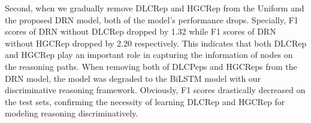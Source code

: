\documentclass[11pt,a4paper]{article}
\begin{document}
\begin{table}[h]
\begin{center}
\caption{Ablation experiments.}
\label{table:ablation}
\end{center}
\end{table}
Second, when we gradually remove DLCRep and HGCRep from the Uniform and the proposed DRN model, both of the model's performance drops.
Specially, F1 scores of DRN without DLCRep dropped by 1.32 while F1 scores of DRN without HGCRep dropped by 2.20 respectively. 
This indicates that both DLCRep and HGCRep play an important role in capturing the information of nodes on the reasoning paths. 
When removing both of DLCPeps and HGCReps from the DRN model, the model was degraded to the BiLSTM model with our discriminative reasoning framework. 
Obviously, F1 scores drastically decreased on the test sets, confirming the necessity of learning DLCRep and HGCRep for modeling reasoning discriminatively.
\end{document}
